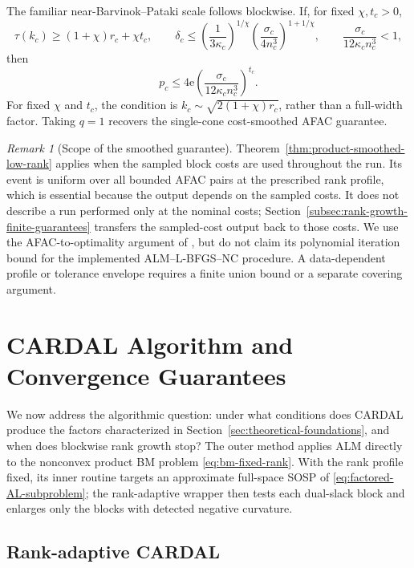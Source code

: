\documentclass[11pt]{article}
\theoremstyle{definition}
\theoremstyle{remark}
\newtheorem{remark}{Remark}
\begin{document}
The familiar near-Barvinok--Pataki scale follows blockwise.  If, for fixed
$\chi,t_c>0$,
\begin{equation}
  \tau(k_c)\geq(1+\chi)r_c+\chi t_c,
  \qquad
  \delta_c\leq
  \left(\frac1{3\kappa_c}\right)^{1/\chi}
  \left(\frac{\sigma_c}{4n_c^3}\right)^{1+1/\chi},
  \qquad
  \frac{\sigma_c}{12\kappa_cn_c^3}<1,
  \label{eq:product-smoothed-simple-conditions}
\end{equation}
then
\[
  p_c\leq
  4\mathrm e
  \left(\frac{\sigma_c}{12\kappa_cn_c^3}\right)^{t_c}.
\]
For fixed $\chi$ and $t_c$, the condition is
$k_c\sim\sqrt{2(1+\chi)r_c}$, rather than a full-width factor.  Taking
$q=1$ recovers the single-cone cost-smoothed AFAC guarantee.

\begin{remark}[Scope of the smoothed guarantee]
\label{rem:smoothed-scope}
Theorem~\ref{thm:product-smoothed-low-rank} applies when the sampled block
costs are used throughout the run.  Its event is uniform over all bounded
AFAC pairs at the prescribed rank profile, which is essential because the output
depends on the sampled costs.  It does not describe a run performed only at
the nominal costs; Section~\ref{subsec:rank-growth-finite-guarantees}
transfers the sampled-cost output back to those costs.  We use the
AFAC-to-optimality argument of \cite{cifuentes2022polynomial}, but do not
claim its polynomial iteration bound for the implemented ALM--L-BFGS--NC
procedure.  A data-dependent profile or tolerance envelope requires a finite
union bound or a separate covering argument.
\end{remark}

\section{CARDAL Algorithm and Convergence Guarantees}
\label{sec:algorithm-convergence}

We now address the algorithmic question: under what conditions does CARDAL
produce the factors characterized in Section~\ref{sec:theoretical-foundations},
and when does blockwise rank growth stop?  The outer method applies ALM directly
to the nonconvex product BM problem \eqref{eq:bm-fixed-rank}.  With the rank
profile fixed, its inner routine targets an approximate full-space SOSP of
\eqref{eq:factored-AL-subproblem}; the rank-adaptive wrapper then tests each
dual-slack block and enlarges only the blocks with detected negative
curvature.

\subsection{Rank-adaptive CARDAL}
\label{subsec:alm-lbfgs-nc}
\end{document}

